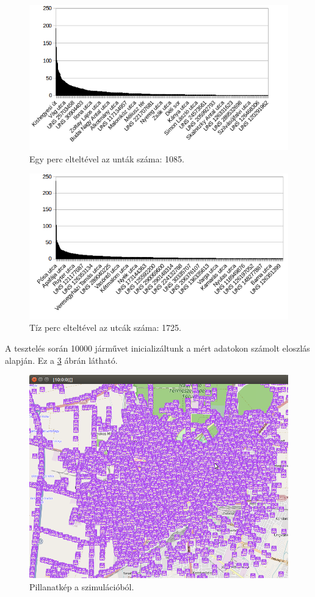 \documentclass[a4paper,12pt]{report}
\begin{document}
\begin{figure}[h]
\centerline{
\includegraphics[scale=.8]{img/a2}}
\caption{Egy perc elteltével az unták száma: 1085.}
\label{histb}
\end{figure}

\begin{figure}[h]
\centerline{
\includegraphics[scale=.8]{img/a3}}
\caption{Tíz perc elteltével az utcák száma: 1725.}
\label{histc}
\end{figure}

A tesztelés során 10000 járművet inicializáltunk a mért adatokon számolt eloszlás alapján. Ez a \ref{simultenth} ábrán látható.

\begin{figure}[h]
\centerline{
\includegraphics[scale=.5]{img/a33}}
\caption{Pillanatkép a szimulációból.}
\label{simultenth}
\end{figure}
\end{document}
